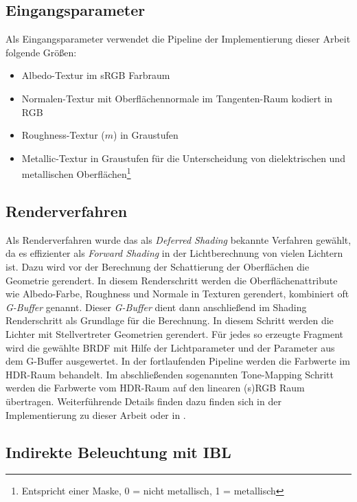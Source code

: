 \subsection{Eingangsparameter}

Als Eingangsparameter verwendet die Pipeline der Implementierung dieser Arbeit folgende Größen:
\begin{itemize}
\item Albedo-Textur im sRGB Farbraum
\item Normalen-Textur mit Oberflächennormale im Tangenten-Raum kodiert in RGB
\item Roughness-Textur ($m$) in Graustufen
\item Metallic-Textur in Graustufen für die Unterscheidung von dielektrischen und metallischen Oberflächen\footnote{Entspricht einer Maske, 0 = nicht metallisch, 1 = metallisch}
\end{itemize}


\subsection{Renderverfahren}

Als Renderverfahren wurde das als \textit{Deferred Shading} bekannte Verfahren gewählt, da es effizienter als \textit{Forward Shading} in der Lichtberechnung von vielen Lichtern ist. Dazu wird vor der Berechnung der Schattierung der Oberflächen die Geometrie gerendert. In diesem Renderschritt werden die Oberflächenattribute wie Albedo-Farbe, Roughness und Normale in Texturen gerendert, kombiniert oft \textit{G-Buffer} genannt. Dieser \textit{G-Buffer} dient dann anschließend im Shading Renderschritt als Grundlage für die Berechnung. In diesem Schritt werden die Lichter mit Stellvertreter Geometrien gerendert. Für jedes so erzeugte Fragment wird die gewählte \ac{BRDF} mit Hilfe der Lichtparameter und der Parameter aus dem G-Buffer ausgewertet. In der fortlaufenden Pipeline werden die Farbwerte im HDR-Raum behandelt. Im abschließenden sogenannten Tone-Mapping Schritt werden die Farbwerte vom HDR-Raum auf den linearen (s)RGB Raum übertragen. Weiterführende Details finden dazu finden sich in der Implementierung zu dieser Arbeit oder in \cite{Shishkovtsov2005}.

\subsection[Indirekte Beleuchtung]{Indirekte Beleuchtung mit \acl{IBL}}


